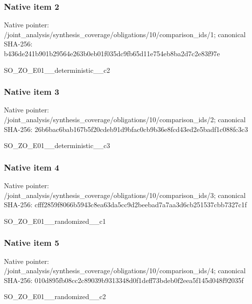 \documentclass[10pt,a4paper]{article}
\begin{document}
\subsubsection{Native item 2}
Native pointer: /joint\_\allowbreak{}analysis/synthesis\_\allowbreak{}coverage/obligations/10/comparison\_\allowbreak{}ids/1; canonical SHA-256: b436de241b901b29564e263b0eb01f035dc9fb65d11e754eb8ba2d7c2e83f97e

\begingroup\raggedright\sloppy SO\_\allowbreak{}ZO\_\allowbreak{}E01\_\allowbreak{}\_\allowbreak{}deterministic\_\allowbreak{}\_\allowbreak{}c2\par\endgroup

\subsubsection{Native item 3}
Native pointer: /joint\_\allowbreak{}analysis/synthesis\_\allowbreak{}coverage/obligations/10/comparison\_\allowbreak{}ids/2; canonical SHA-256: 26b6bac6bab167b5f20cdeb91d9bfac0cb9b36e8fcd43ed2e5badf1c088fc3c3

\begingroup\raggedright\sloppy SO\_\allowbreak{}ZO\_\allowbreak{}E01\_\allowbreak{}\_\allowbreak{}deterministic\_\allowbreak{}\_\allowbreak{}c3\par\endgroup

\subsubsection{Native item 4}
Native pointer: /joint\_\allowbreak{}analysis/synthesis\_\allowbreak{}coverage/obligations/10/comparison\_\allowbreak{}ids/3; canonical SHA-256: cfff2859f8066b5943c8ea63da5cc9d2beebad7a7aa3d6cb251537cbb7327c1f

\begingroup\raggedright\sloppy SO\_\allowbreak{}ZO\_\allowbreak{}E01\_\allowbreak{}\_\allowbreak{}randomized\_\allowbreak{}\_\allowbreak{}c1\par\endgroup

\subsubsection{Native item 5}
Native pointer: /joint\_\allowbreak{}analysis/synthesis\_\allowbreak{}coverage/obligations/10/comparison\_\allowbreak{}ids/4; canonical SHA-256: 010d895fb08cc2c89039b9313348d0f1deff73bdeb0f2eea5f145d048f92035f

\begingroup\raggedright\sloppy SO\_\allowbreak{}ZO\_\allowbreak{}E01\_\allowbreak{}\_\allowbreak{}randomized\_\allowbreak{}\_\allowbreak{}c2\par\endgroup
\end{document}
